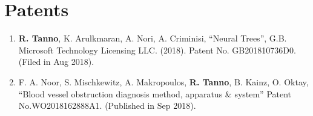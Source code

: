 \newpage
\section*{Patents}
\begin{enumerate}
	\item  \textbf{R. Tanno}, K. Arulkmaran, A. Nori, A. Criminisi, “Neural Trees”, G.B. Microsoft Technology Licensing LLC. (2018). Patent No. GB201810736D0. (Filed in Aug 2018).
	\item F. A. Noor, S. Mischkewitz, A. Makropoulos, \textbf{R. Tanno}, B. Kainz, O. Oktay, “Blood vessel obstruction diagnosis method, apparatus \& system”  Patent No.WO2018162888A1. (Published in Sep 2018).
	
\end{enumerate}

